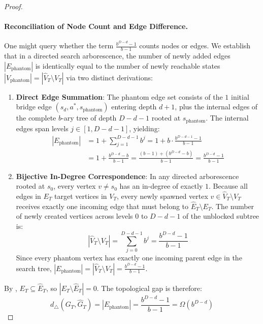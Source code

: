 \documentclass[11pt,a4paper]{article}
\theoremstyle{definition}
\theoremstyle{remark}
\begin{document}
\begin{proof}
\paragraph{Reconciliation of Node Count and Edge Difference.}
One might query whether the term $\frac{b^{D-d}-1}{b-1}$ counts nodes or edges. We establish that in a directed search arborescence, the number of newly added edges $|E_{\text{phantom}}|$ is identically equal to the number of newly reachable states $|V_{\text{phantom}}| = |\widehat{V}_T \setminus V_T|$ via two distinct derivations:
\begin{enumerate}
    \item \textbf{Direct Edge Summation}: The phantom edge set consists of the $1$ initial bridge edge $(s_d, a^*, s_{\text{phantom}})$ entering depth $d+1$, plus the internal edges of the complete $b$-ary tree of depth $D - d - 1$ rooted at $s_{\text{phantom}}$. The internal edges span levels $j \in [1, D-d-1]$, yielding:
    \begin{align}
        |E_{\text{phantom}}| &= 1 + \sum_{j=1}^{D-d-1} b^j = 1 + b \cdot \frac{b^{D-d-1} - 1}{b - 1} \\
        &= 1 + \frac{b^{D-d} - b}{b - 1} = \frac{(b - 1) + (b^{D-d} - b)}{b - 1} = \frac{b^{D-d} - 1}{b - 1}
    \end{align}
    \item \textbf{Bijective In-Degree Correspondence}: In any directed arborescence rooted at $s_0$, every vertex $v \ne s_0$ has an in-degree of exactly $1$. Because all edges in $E_T$ target vertices in $V_T$, every newly spawned vertex $v \in \widehat{V}_T \setminus V_T$ receives exactly one incoming edge that must belong to $\widehat{E}_T \setminus E_T$. The number of newly created vertices across levels $0$ to $D-d-1$ of the unblocked subtree is:
    \begin{equation}
        |\widehat{V}_T \setminus V_T| = \sum_{j=0}^{D-d-1} b^j = \frac{b^{D-d} - 1}{b - 1}
    \end{equation}
    Since every phantom vertex has exactly one incoming parent edge in the search tree, $|E_{\text{phantom}}| = |\widehat{V}_T \setminus V_T| = \frac{b^{D-d}-1}{b-1}$.
\end{enumerate}
By , $E_T \subseteq \widehat{E}_T$, so $|E_T \setminus \widehat{E}_T| = 0$. The topological gap is therefore:
\begin{equation}
    d_\triangle(G_T, \widehat{G}_T) = |E_{\text{phantom}}| = \frac{b^{D-d} - 1}{b - 1} = \Omega\left(b^{D-d}\right)
\end{equation}

\end{proof}
\end{document}
